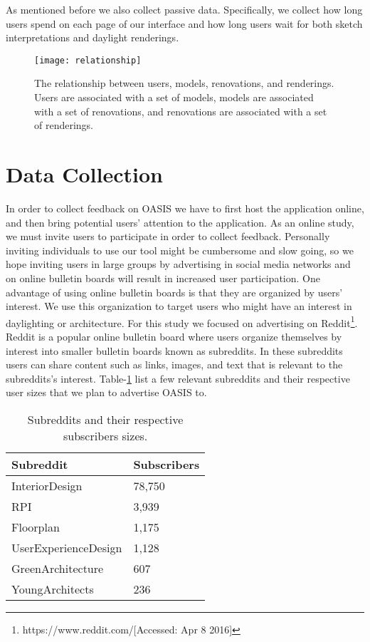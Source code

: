 				
	As mentioned before we also collect passive data.
	Specifically, we collect how long users spend on each page of our interface and how long users wait for both  sketch interpretations and daylight renderings.

	\begin{figure}[h]
	\caption[The relationship between users, models, renovations, and renderings.]{The relationship between users, models, renovations, and renderings. Users are associated with a set of models, models are associated with a set of renovations, and renovations are associated with a set of renderings.}
	\label{fig:rel}	
	\texttt{[image: relationship]}

	\end{figure}


\section{Data Collection}
	In order to collect feedback on OASIS we have to first host the application online, and then bring potential users' attention to the application. As an online study, we must invite users to participate in order to collect feedback.
	Personally inviting individuals to use our tool might be cumbersome and slow going, so we hope inviting users in large groups by advertising in social media networks and on online bulletin boards will result in increased user participation. One advantage of using online bulletin boards is that they are organized by users' interest.  We use this organization to target users who might have an interest in daylighting or architecture. For this study we focused on advertising on  Reddit\footnote{https://www.reddit.com/[Accessed: Apr 8 2016]}. Reddit is a popular online bulletin board where users organize themselves by interest into smaller bulletin boards known as subreddits. In these subreddits users can share content such as links, images, and text that is relevant to the subreddits's interest. Table-\ref{fig:reddit} list a few relevant subreddits and their respective user sizes that we plan to advertise OASIS to.
	

	\begin{table}[ht!]
	\centering
	    \caption{Subreddits and their respective subscribers sizes.}
	    \label{fig:reddit}
	    \begin{tabular}{ | l | l | }
	        \hline
		    Subreddit               & Subscribers  \\ \hline
		    InteriorDesign 			& 78,750        \\ \hline
		    RPI 			        & 3,939         \\ \hline
		    Floorplan    			& 1,175         \\ \hline
		    UserExperienceDesign    & 1,128         \\ \hline
		    GreenArchitecture 		& 607          \\ \hline
		    YoungArchitects 		& 236          \\ \hline
	    \end{tabular}
	\end{table}

